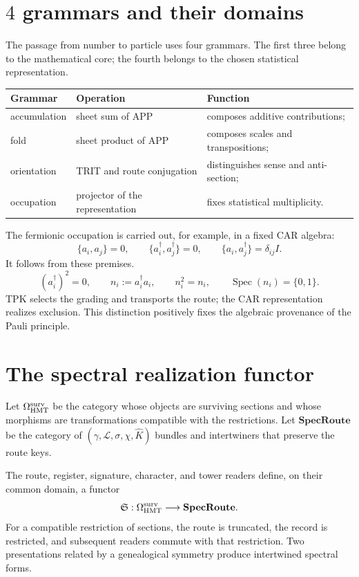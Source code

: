 \section{\(4\) grammars and their domains}

The passage from number to particle uses four grammars. The
first three belong to the mathematical core; the fourth belongs to the
chosen statistical representation.

\begin{center}
\begin{tabular}{@{}lll@{}}
\toprule
\textbf{Grammar} & \textbf{Operation} & \textbf{Function}\\
\midrule
accumulation & sheet sum of APP & composes additive contributions;\\
fold & sheet product of APP & composes scales and transpositions;\\
orientation & TRIT and route conjugation & distinguishes sense and anti-section;\\
occupation & projector of the representation & fixes statistical multiplicity.\\
\bottomrule
\end{tabular}
\end{center}

The fermionic occupation is carried out, for example, in a fixed CAR algebra:
\[
 \{a_i,a_j\}=0,
 \qquad
 \{a_i^\dagger,a_j^\dagger\}=0,
 \qquad
 \{a_i,a_j^\dagger\}=\delta_{ij}I.
\]
It follows from these premises.
\[
 (a_i^\dagger)^2=0,
 \qquad
 n_i:=a_i^\dagger a_i,
 \qquad
 n_i^2=n_i,
 \qquad
 \operatorname{Spec}(n_i)=\{0,1\}.
\]
TPK selects the grading and transports the route; the CAR representation
realizes exclusion. This distinction positively fixes the algebraic
provenance of the Pauli principle.

\section{The spectral realization functor}

Let \(\Omega_{\rm HMT}^{\rm surv}\) be the category whose objects are surviving
sections and whose morphisms are transformations compatible with the
restrictions. Let \(\mathbf{SpecRoute}\) be the category of
\((\gamma,\mathcal L,\sigma,\chi,\widehat K)\) bundles and intertwiners that
preserve the route keys.

\begin{theorem}
\label{thm:functor-realizacion-espectral-numero}
The route, register, signature, character, and tower readers define, on their
common domain, a functor
\[
 \mathfrak S:
 \Omega_{\rm HMT}^{\rm surv}\longrightarrow\mathbf{SpecRoute}.
\]
For a compatible restriction of sections, the route is truncated, the record
is restricted, and subsequent readers commute with that restriction. Two
presentations related by a genealogical symmetry produce intertwined spectral
forms.
\end{theorem}

